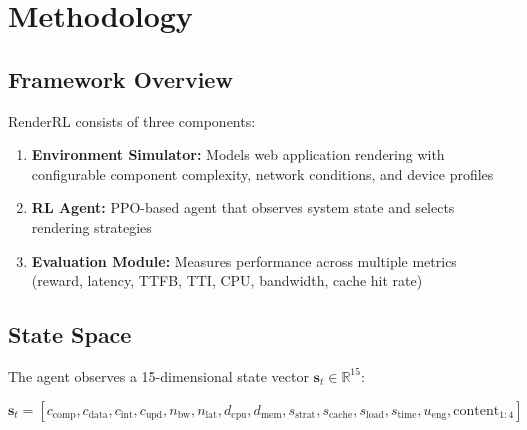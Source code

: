 \documentclass[10pt,twocolumn]{article}
\newcommand{\method}{RenderRL}
\newcommand{\reals}{\mathbb{R}}
\begin{document}
\section{Methodology}
\label{sec:methodology}

\subsection{Framework Overview}

\method{} consists of three components:

\begin{enumerate}[nosep]
\item \textbf{Environment Simulator:} Models web application rendering with configurable component complexity, network conditions, and device profiles
\item \textbf{RL Agent:} PPO-based agent that observes system state and selects rendering strategies
\item \textbf{Evaluation Module:} Measures performance across multiple metrics (reward, latency, TTFB, TTI, CPU, bandwidth, cache hit rate)
\end{enumerate}

\subsection{State Space}

The agent observes a 15-dimensional state vector $\mathbf{s}_t \in \reals^{15}$:

\begin{equation}
\mathbf{s}_t = [c_{\text{comp}}, c_{\text{data}}, c_{\text{int}}, c_{\text{upd}}, n_{\text{bw}}, n_{\text{lat}}, d_{\text{cpu}}, d_{\text{mem}}, s_{\text{strat}}, s_{\text{cache}}, s_{\text{load}}, s_{\text{time}}, u_{\text{eng}}, \text{content}_{1:4}]
\end{equation}
\end{document}

